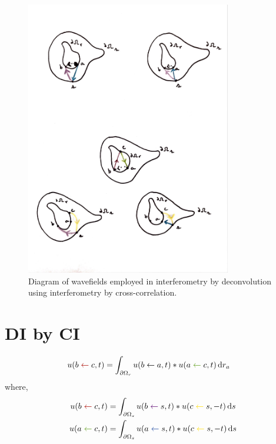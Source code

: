\documentclass[a4paper,12pt]{article}
\begin{document}
\begin{figure}[!h]
\centering
\includegraphics[trim={10 90 10 390},clip,width=0.8\textwidth]{../pics/interferometry-diagram.pdf}
\caption{Diagram of wavefields employed in interferometry by deconvolution using interferometry by cross-correlation.}
\end{figure}
\clearpage
\section*{DI by CI}
\begin{align}
u(b\color{rojoAmor}\gets\color{black}c,t) &= \int_{\partial\Omega_r} u(b\gets a,t)*u(a\color{verdeAmor}\gets\color{black}c,t)\,{\rm d}r_a
\end{align}
where,
\begin{align}
u(b\color{rojoAmor}\gets\color{black}c,t) &= \int_{\partial\Omega_s} u(b\color{moradoAmor}\gets \color{black}s,t)*u(c\color{nyellow}\gets\color{black}s,-t)\,{\rm d}s\\
u(a\color{verdeAmor}\gets\color{black}c,t) &= \int_{\partial\Omega_s} u(a\color{boiseBlue}\gets \color{black}s,t)*u(c\color{nyellow}\gets\color{black}s,-t)\,{\rm d}s
\end{align}
\end{document}
